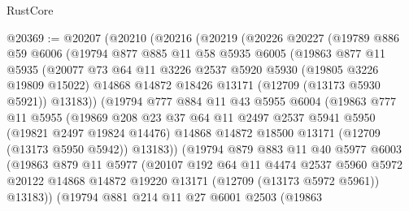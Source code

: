\begin{lexlean}{RustCore}
\begin{coremodule}
@20369 := @20207
    (@20210
      (@20216
        (@20219
          (@20226
            @20227
            (@19789
              @886
              @59
              @6006
              (@19794
                @877
                @885
                @11
                @58
                @5935
                @6005
                (@19863
                  @877
                  @11
                  @5935
                  (@20077
                    @73
                    @64
                    @11
                    @3226
                    @2537
                    @5920
                    @5930
                    (@19805 @3226 @19809 @15022)
                    @14868
                    @14872
                    @18426
                    @13171
                    (@12709 (@13173 @5930 @5921))
                    @13183))
                (@19794
                  @777
                  @884
                  @11
                  @43
                  @5955
                  @6004
                  (@19863
                    @777
                    @11
                    @5955
                    (@19869
                      @208
                      @23
                      @37
                      @64
                      @11
                      @2497
                      @2537
                      @5941
                      @5950
                      (@19821 @2497 @19824 @14476)
                      @14868
                      @14872
                      @18500
                      @13171
                      (@12709 (@13173 @5950 @5942))
                      @13183))
                  (@19794
                    @879
                    @883
                    @11
                    @40
                    @5977
                    @6003
                    (@19863
                      @879
                      @11
                      @5977
                      (@20107
                        @192
                        @64
                        @11
                        @4474
                        @2537
                        @5960
                        @5972
                        @20122
                        @14868
                        @14872
                        @19220
                        @13171
                        (@12709 (@13173 @5972 @5961))
                        @13183))
                    (@19794
                      @881
                      @214
                      @11
                      @27
                      @6001
                      @2503
                      (@19863

\end{coremodule}
\end{lexlean}
